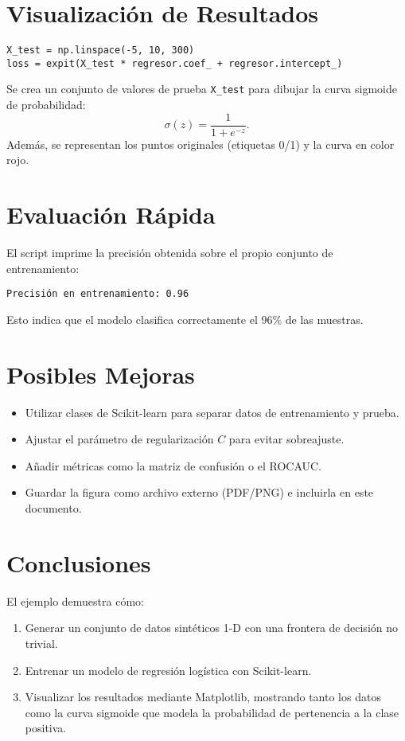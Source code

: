\documentclass[11pt]{article}
\begin{document}
\section{Visualización de Resultados}
\begin{verbatim}
X_test = np.linspace(-5, 10, 300)
loss = expit(X_test * regresor.coef_ + regresor.intercept_)
\end{verbatim}
Se crea un conjunto de valores de prueba \texttt{X\_test} para dibujar la curva sigmoide de probabilidad:
\begin{equation}
\sigma(z) = \frac{1}{1 + e^{-z}}.
\end{equation}
Además, se representan los puntos originales (etiquetas 0/1) y la curva en color rojo.

\section{Evaluación Rápida}
El script imprime la precisión obtenida sobre el propio conjunto de entrenamiento:
\begin{verbatim}
Precisión en entrenamiento: 0.96
\end{verbatim}
\vspace{1em}
Esto indica que el modelo clasifica correctamente el 96\% de las muestras.

\section{Posibles Mejoras}
\begin{itemize}
  \item Utilizar clases de Scikit\nobreakdash-learn para separar datos de entrenamiento y prueba.
  \item Ajustar el parámetro de regularización $C$ para evitar sobreajuste.
  \item Añadir métricas como la matriz de confusión o el ROC\nobreakdash\-AUC.
  \item Guardar la figura como archivo externo (PDF/PNG) e incluirla en este documento.
\end{itemize}

\section{Conclusiones}
El ejemplo demuestra cómo:
\begin{enumerate}
  \item Generar un conjunto de datos sintéticos 1\nobreakdash-D con una frontera de decisión no trivial.
  \item Entrenar un modelo de regresión logística con Scikit\nobreakdash-learn.
  \item Visualizar los resultados mediante Matplotlib, mostrando tanto los datos como la curva sigmoide que modela la probabilidad de pertenencia a la clase positiva.
\end{enumerate}
\end{document}
